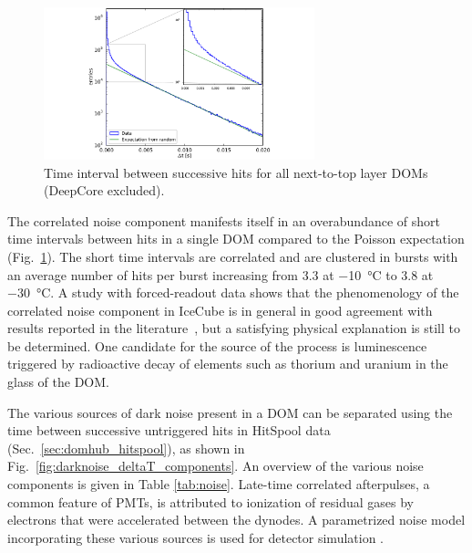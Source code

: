 \begin{figure}
  \centering
  \includegraphics[width=0.7\textwidth]{graphics/dom/performance/darknoise/DarkNoise_Layer2Doms.pdf}
 \caption{Time interval between successive hits for all next-to-top layer DOMs (DeepCore excluded).}
 \label{fig:darknoise_deltaT}
\end{figure}

The correlated noise component manifests itself in an overabundance of
short time intervals between hits in a single DOM compared to the
Poisson expectation (Fig.~\ref{fig:darknoise_deltaT}). The short time
intervals are correlated and are clustered in bursts with an average number of
hits per burst increasing from \num{3.3} at \SI{-10}{\celsius} to \num{3.8} at
\SI{-30}{\celsius}. A study with forced-readout data shows that the
phenomenology of the correlated noise component in IceCube is in general in
good agreement with results reported in the literature~\cite{meyer_noise}, but a satisfying
physical explanation is still to be determined.  One candidate for the source
of the process is luminescence triggered by radioactive decay of
elements such as thorium and uranium in the glass of the DOM.

The various sources of dark noise present in a DOM can be separated using
the time between successive untriggered hits in HitSpool data
(Sec.~\ref{sec:domhub_hitspool}), as shown in 
Fig.~\ref{fig:darknoise_deltaT_components}. An overview of the various 
noise components is given in Table \ref{tab:noise}.  Late-time
correlated afterpulses, a common feature of PMTs, is attributed to
ionization of residual gases by electrons that were accelerated between
the dynodes.  A parametrized noise model incorporating these various sources
is used for detector simulation \cite{larson2013simulation}. 

